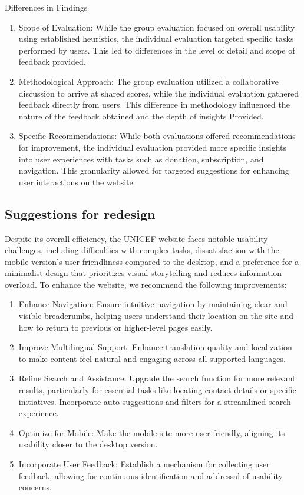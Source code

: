 Differences in Findings
\begin{enumerate}
\item  Scope of Evaluation: While the group evaluation focused on overall usability using established heuristics, the individual evaluation targeted specific tasks performed by users. This led to differences in the level of detail and scope of feedback provided.

\item Methodological Approach: The group evaluation utilized a collaborative discussion to arrive at shared scores, while the individual evaluation gathered feedback directly from users. This difference in methodology influenced the nature of the feedback obtained and the depth of insights Provided.

\item Specific Recommendations: While both evaluations offered recommendations for improvement, the individual evaluation provided more specific insights into user experiences with tasks such as donation, subscription, and navigation. This granularity allowed for targeted suggestions for enhancing user interactions on the website.
\end{enumerate}


\subsection{Suggestions for redesign}
Despite its overall efficiency, the UNICEF website faces notable usability challenges, including difficulties with complex tasks, dissatisfaction with the mobile version's user-friendliness compared to the desktop, and a preference for a minimalist design that prioritizes visual storytelling and reduces information overload.
To enhance the website, we recommend the following improvements:

\begin{enumerate}
	\item Enhance Navigation: Ensure intuitive navigation by maintaining clear and visible breadcrumbs, helping users understand their location on the site and how to return to previous or higher-level pages easily.
	
	\item Improve Multilingual Support: Enhance translation quality and localization to make content feel natural and engaging across all supported languages.
	
	\item Refine Search and Assistance: Upgrade the search function for more relevant results, particularly for essential tasks like locating contact details or specific initiatives. Incorporate auto-suggestions and filters for a streamlined search experience.
	\item Optimize for Mobile: Make the mobile site more user-friendly, aligning its usability closer to the desktop version.
	\item Incorporate User Feedback: Establish a mechanism for collecting user feedback, allowing for continuous identification and addressal of usability concerns.
\end{enumerate}

